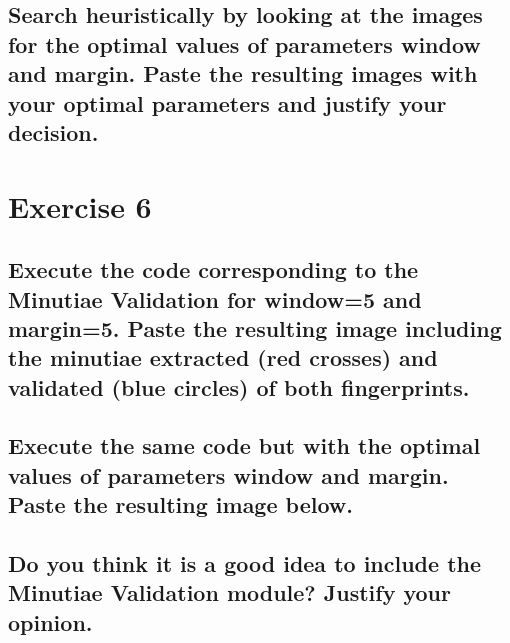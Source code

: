\documentclass[a4paper]{article}
\begin{document}
\subsection{Search heuristically by looking at the images for the optimal values of parameters window and margin. Paste the resulting images with your optimal parameters and justify your decision.}




















\section{Exercise 6}

\subsection{ Execute the code corresponding to the Minutiae Validation for window=5 and margin=5.  Paste the resulting image including the minutiae extracted (red crosses) and validated (blue circles) of both fingerprints. }

















\subsection{ Execute the same code but with the optimal values of parameters window and margin. Paste the resulting image below. }


















\subsection{ Do you think it is a good idea to include the Minutiae Validation module? Justify your opinion. }
\end{document}
